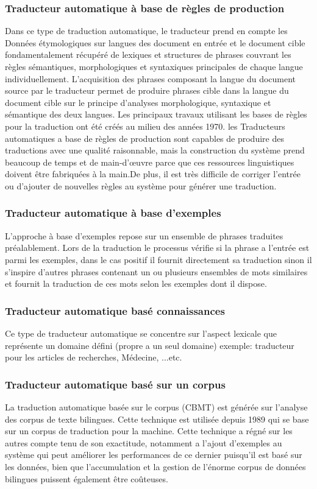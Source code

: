         \subsubsection{Traducteur automatique à base de règles de production}
        Dans ce type de traduction automatique, le traducteur prend en compte les Données étymologiques sur langues des document en entrée et le document cible fondamentalement récupéré de 
        lexiques et structures de phrases couvrant les règles sémantiques, morphologiques et syntaxiques principales de chaque langue individuellement. L'acquisition des phrases composant la langue du document source par le traducteur permet de produire phrases cible dans la langue du document cible sur le principe d'analyses morphologique, syntaxique et sémantique des deux langues.
        Les principaux travaux utilisant les bases de règles pour la traduction ont été créés au milieu des années 1970.\cite{surveyTraduction}
        les Traducteurs automatiques a base de règles de production sont capables de produire des traductions avec une qualité raisonnable, mais la construction du système prend beaucoup de temps et de main-d'œuvre parce que ces ressources linguistiques doivent être fabriquées à la main.De plus, il est très difficile de corriger l'entrée ou d'ajouter de nouvelles règles au système pour générer une traduction.\cite{jean}
        \subsubsection{Traducteur automatique à base d'exemples}
        L'approche à base d'exemples repose sur un ensemble de phrases traduites préalablement. Lors de la traduction le processus vérifie si la phrase a l'entrée est parmi les exemples, dans le cas positif il fournit directement sa traduction sinon il s'inspire d'autres phrases contenant un ou plusieurs ensembles de mots similaires et fournit la traduction de ces mots selon les exemples dont il dispose.\cite{setif}
        \subsubsection{Traducteur automatique basé connaissances}
        Ce type de traducteur automatique se concentre sur l'aspect lexicale que représente un domaine défini (propre a un seul domaine) exemple: traducteur pour les articles de recherches, Médecine, ...etc.\cite{surveyTraduction}
        \subsubsection{Traducteur automatique basé sur un corpus}
        La traduction automatique basée sur le corpus (CBMT) est générée sur l'analyse des corpus de texte bilingues. Cette technique est utilisée depuis 1989 qui se base sur un corpus de traduction pour la machine. Cette technique a régné sur les autres compte tenu de son exactitude, notamment a l'ajout d'exemples au système qui peut améliorer les performances de ce dernier puisqu'il est basé sur les données, bien que l'accumulation et la gestion de l'énorme corpus de données bilingues puissent également être coûteuses.\cite{jean}
